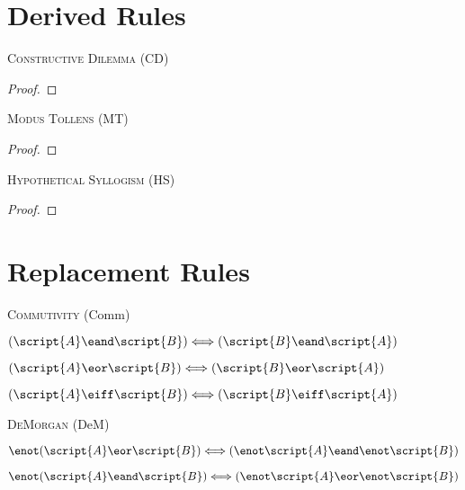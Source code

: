 \begin{multicols}{2}
\section*{Derived Rules}

\textsc{Constructive Dilemma (CD)}

\begin{proof}
	 
\end{proof}

\noindent\textsc{Modus Tollens (MT)}

\begin{proof}
	 
\end{proof}

\noindent\textsc{Hypothetical Syllogism (HS)}

\begin{proof}
\end{proof}

\vfill

\section*{Replacement Rules}


\textsc{Commutivity} (Comm)
\begin{earg}
\item[] $(\script{A}\eand\script{B}) \Longleftrightarrow (\script{B}\eand\script{A})$\\
\item[] $(\script{A}\eor\script{B}) \Longleftrightarrow (\script{B}\eor\script{A})$\\
\item[] $(\script{A}\eiff\script{B}) \Longleftrightarrow (\script{B}\eiff\script{A})$
\end{earg}


\noindent\textsc{DeMorgan} (DeM)
\begin{earg}
\item[] $\enot(\script{A}\eor\script{B}) \Longleftrightarrow (\enot\script{A}\eand\enot\script{B})$\\
\item[] $\enot(\script{A}\eand\script{B}) \Longleftrightarrow (\enot\script{A}\eor\enot\script{B})$
\end{earg}


\end{multicols}
